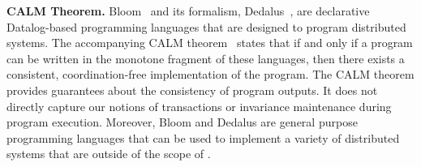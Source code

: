 
\textbf{CALM Theorem.}
Bloom~\cite{alvaro2010boom, alvaro2011consistency, conway2012logic} and its
formalism, Dedalus~\cite{alvaro2011dedalus, alvaro2013declarative}, are
declarative Datalog-based programming languages that are designed to program
distributed systems. The accompanying CALM
theorem~\cite{hellerstein2010declarative, ameloot2013relational} states that if and only if
a program can be written in the monotone fragment of these languages, then
there exists a consistent, coordination-free implementation of the program.  The CALM
theorem provides guarantees about the consistency of program outputs. It does not directly capture our notions of transactions or invariance maintenance during program execution.
Moreover, Bloom and Dedalus are general purpose programming
languages that can be used to implement a variety of distributed systems that
are outside of the scope of \invariantconfluence{}.

